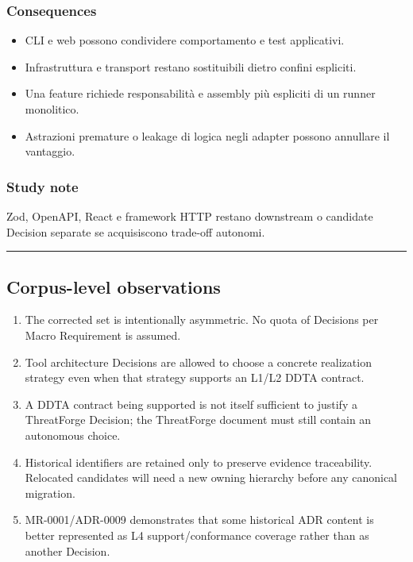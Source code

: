 \documentclass[
  10pt,
  a4paper,
]{article}
\providecommand{\tightlist}{%
  \setlength{\itemsep}{0pt}\setlength{\parskip}{0pt}}
\begin{document}
\subsubsection{Consequences}\label{consequences-14}

\begin{itemize}
\tightlist
\item
  CLI e web possono condividere comportamento e test applicativi.
\item
  Infrastruttura e transport restano sostituibili dietro confini
  espliciti.
\item
  Una feature richiede responsabilità e assembly più espliciti di un
  runner monolitico.
\item
  Astrazioni premature o leakage di logica negli adapter possono
  annullare il vantaggio.
\end{itemize}

\subsubsection{Study note}\label{study-note-6}

Zod, OpenAPI, React e framework HTTP restano downstream o candidate
Decision separate se acquisiscono trade-off autonomi.

\begin{center}\rule{0.5\linewidth}{0.5pt}\end{center}

\subsection{Corpus-level observations}\label{corpus-level-observations}

\begin{enumerate}
\def\labelenumi{\arabic{enumi}.}
\tightlist
\item
  The corrected set is intentionally asymmetric. No quota of Decisions
  per Macro Requirement is assumed.
\item
  Tool architecture Decisions are allowed to choose a concrete
  realization strategy even when that strategy supports an L1/L2 DDTA
  contract.
\item
  A DDTA contract being supported is not itself sufficient to justify a
  ThreatForge Decision; the ThreatForge document must still contain an
  autonomous choice.
\item
  Historical identifiers are retained only to preserve evidence
  traceability. Relocated candidates will need a new owning hierarchy
  before any canonical migration.
\item
  MR-0001/ADR-0009 demonstrates that some historical ADR content is
  better represented as L4 support/conformance coverage rather than as
  another Decision.
\end{enumerate}
\end{document}
